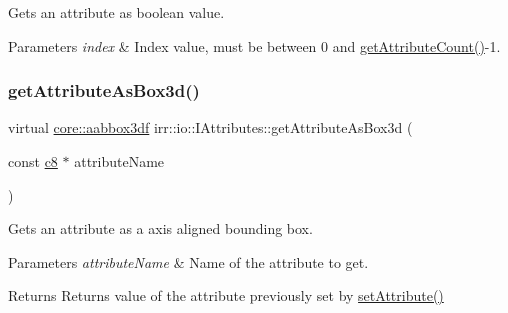 Gets an attribute as boolean value. 


\begin{DoxyParams}{Parameters}
{\em index} & Index value, must be between 0 and \hyperlink{classirr_1_1io_1_1IAttributes_a796bdd9440ee7ba0b6742a90a82870b6}{get\+Attribute\+Count()}-\/1. \\
\hline
\end{DoxyParams}
\mbox{\label{classirr_1_1io_1_1IAttributes_a215218b9b1ebb8313557b44bb3bce363}} 
\subsubsection{\texorpdfstring{get\+Attribute\+As\+Box3d()}{getAttributeAsBox3d()}\hspace{0.1cm}{\footnotesize\ttfamily [1/2]}}
{\footnotesize\ttfamily virtual \hyperlink{namespaceirr_1_1core_adfc8fa01b30044c55f3332a1d6c1aa19}{core\+::aabbox3df} irr\+::io\+::\+I\+Attributes\+::get\+Attribute\+As\+Box3d (\begin{DoxyParamCaption}\item[{const \hyperlink{namespaceirr_a9395eaea339bcb546b319e9c96bf7410}{c8} $\ast$}]{attribute\+Name }\end{DoxyParamCaption})\hspace{0.3cm}{\ttfamily [pure virtual]}}



Gets an attribute as a axis aligned bounding box. 


\begin{DoxyParams}{Parameters}
{\em attribute\+Name} & Name of the attribute to get. \\
\hline
\end{DoxyParams}
\begin{DoxyReturn}{Returns}
Returns value of the attribute previously set by \hyperlink{classirr_1_1io_1_1IAttributes_a03fa31acb481ae23678676cc183f09a6}{set\+Attribute()} 
\end{DoxyReturn}
\mbox{\label{classirr_1_1io_1_1IAttributes_a3da2aafbf1bfe8bcdb7dfa2866a4efe4}} 
